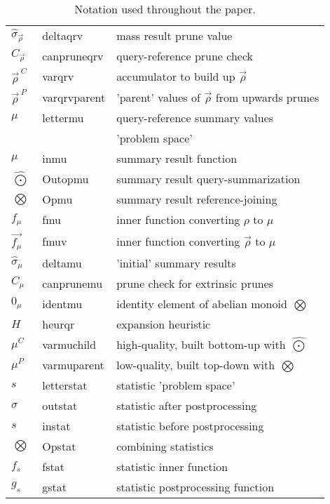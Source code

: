 \documentclass[times, leqno,twocolumn]{article}
\newcommand{\summary}{\hat{\sigma}}
\newcommand{\nameOp}[2]{\mathop{#1\nolimits\!\!_{#2}}}
\newcommand{\myOp}[1]{\nameOp{\bigotimes}{#1}}
\newcommand{\inqr}{\rho}
\newcommand{\letterqrv}{\vec{\rho}}
\newcommand{\inqrv}{\vec{\rho}}
\newcommand{\deltaqrv}{\summary_{\!\letterqrv}}
\newcommand{\canpruneqrv}{C_{\!\letterqrv}}
\newcommand{\varqrv}{\letterqrv^{\:C\!}}
\newcommand{\varqrvparent}{\letterqrv^{\:P\!}}
\newcommand{\lettermu}{\mu}
\newcommand{\inmu}{\mu}
\newcommand{\Outopmu}{\widehat{\nameOp{\bigodot}{\lettermu}}}%
\newcommand{\Opmu}{\myOp{\lettermu}}
\newcommand{\fmu}{f_{\!\lettermu}}
\newcommand{\fmuv}{\vec{f_{\!\lettermu}}}
\newcommand{\deltamu}{\summary_{\!\lettermu}}
\newcommand{\canprunemu}{C_{\!\lettermu}}
\newcommand{\heurqr}{H}
\newcommand{\identmu}{0_{\lettermu}}
\newcommand{\varmuchild}{\lettermu^{\!C}}
\newcommand{\varmuparent}{\lettermu^{\!P}}
\newcommand{\letterstat}{s}
\newcommand{\outstat}{\sigma}
\newcommand{\instat}{s}
\newcommand{\Opstat}{\myOp{\letterstat}}
\newcommand{\fstat}{f_{\!\letterstat}}
\newcommand{\gstat}{g_{\!\letterstat}}
\begin{document}
\begin{appendix}
\begin{table*}
\begin{tabular}{|l|l|l|}
\\ $\deltaqrv$ & deltaqrv & mass result prune value
\\ $\canpruneqrv$ & canpruneqrv & query-reference prune check
\\ $\varqrv$ & varqrv & accumulator to build up $\inqrv$
\\ $\varqrvparent$ & varqrvparent & 'parent' values of $\inqrv$ from upwards prunes
\\ \hline $\lettermu$ & lettermu & query-reference summary values
\\ && 'problem space'
\\ $\inmu$ & inmu & summary result function
\\ $\Outopmu$ & Outopmu & summary result query-summarization
\\ $\Opmu$ & Opmu & summary result reference-joining
\\ $\fmu$ & fmu & inner function converting $\inqr$ to $\inmu$
\\ $\fmuv$ & fmuv & inner function converting $\inqrv$ to $\inmu$
\\ $\deltamu$ & deltamu & 'initial' summary results
\\ $\canprunemu$ & canprunemu & prune check for extrinsic prunes
\\ $\identmu$ & identmu & identity element of abelian monoid $\Opmu$
\\ $\heurqr$ & heurqr & expansion heuristic
\\ $\varmuchild$ & varmuchild & high-quality, built bottom-up with $\Outopmu$
\\ $\varmuparent$ & varmuparent & low-quality, built top-down with $\Opmu$
\\ \hline $\letterstat$ & letterstat & statistic 'problem space'
\\ $\outstat$ & outstat & statistic after postprocessing
\\ $\instat$ & instat & statistic before postprocessing
\\ $\Opstat$ & Opstat & combining statistics
\\ $\fstat$ & fstat & statistic inner function
\\ $\gstat$ & gstat & statistic postprocessing function
\\ \hline
\end{tabular}
\caption{Notation used throughout the paper.}
\label{tab:notation}
\end{table*}

\end{appendix}
\end{document}
